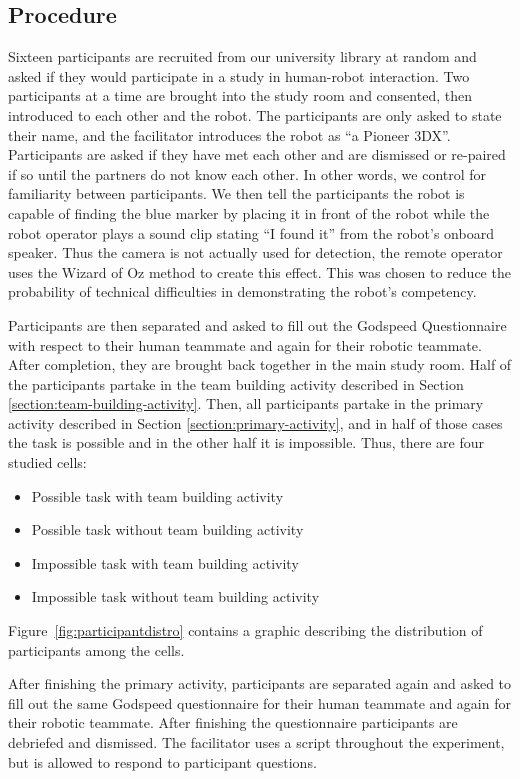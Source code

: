 \documentclass{acm_proc_article-sp}
\begin{document}
\subsection{Procedure}
Sixteen participants are recruited from our university library at random and asked if they would participate in a study in human-robot interaction. Two participants at a time are brought into the study room and consented, then introduced to each other and the robot. The participants are only asked to state their name, and the facilitator introduces the robot as ``a Pioneer 3DX''. Participants are asked if they have met each other and are dismissed or re-paired if so until the partners do not know each other. In other words, we control for familiarity between participants. We then tell the participants the robot is capable of finding the blue marker by placing it in front of the robot while the robot operator plays a sound clip stating ``I found it'' from the robot's onboard speaker. Thus the camera is not actually used for detection, the remote operator uses the Wizard of Oz method to create this effect. This was chosen to reduce the probability of technical difficulties in demonstrating the robot's competency.

Participants are then separated and asked to fill out the Godspeed Questionnaire \cite{Godspeed} with respect to their human teammate and again for their robotic teammate. After completion, they are brought back together in the main study room.
Half of the participants partake in the team building activity described in Section \ref{section:team-building-activity}. Then, all participants partake in the primary activity described in Section \ref{section:primary-activity}, and in half of those cases the task is possible and in the other half it is impossible. Thus, there are four studied cells:
\begin{itemize}
 \item Possible task with team building activity
 \item Possible task without team building activity
 \item Impossible task with team building activity
 \item Impossible task without team building activity
\end{itemize}

Figure~\ref{fig:participantdistro} contains a graphic describing the distribution of participants among the cells. 

After finishing the primary activity, participants are separated again and asked to fill out the same Godspeed questionnaire for their human teammate and again for their robotic teammate. After finishing the questionnaire participants are debriefed and dismissed. The facilitator uses a script throughout the experiment, but is allowed to respond to participant questions. 
\end{document}

